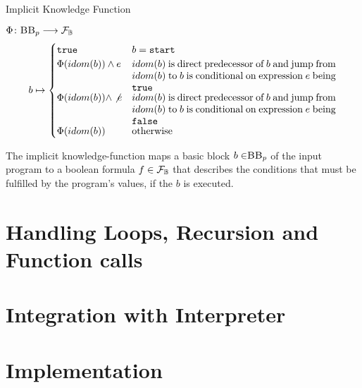 \begin{definition}{Implicit Knowledge Function} %
    \begin{center}
        $\Phi\colon \mbb_p \longrightarrow \mbform$ \\
        
        \begin{equation*}
            b \mapsto
        \begin{cases}
            \mttt & b = \mathtt{start} \\

            \Phi(idom(b)) \land e & \parbox[t]{.6\textwidth}{$idom(b)$ is direct predecessor of $b$ and jump from $idom(b)$ to $b$ is conditional on expression $e$ being \ttt}\\ 

            \Phi(idom(b)) \land \not e & \parbox[t]{.6\textwidth}{$idom(b)$ is direct predecessor of $b$ and jump from $idom(b)$ to $b$ is conditional on expression $e$ being \fff}\\ 

            \Phi(idom(b)) & \text{otherwise}\\ 
        \end{cases}
        \end{equation*}
    \end{center}
    The implicit knowledge-function maps a basic block $b \in \mbb_p$ of the input program \p to a boolean formula $f \in \mathcal{F}_{\mathbb{B}}$ that describes the conditions that must be fulfilled by the program's values, if the $b$ is executed.
\end{definition}


\section{Handling Loops, Recursion and Function calls}

\section{Integration with Interpreter}

\section{Implementation}